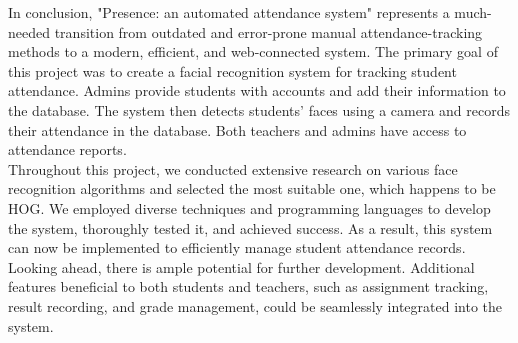In conclusion, "Presence: an automated attendance system" represents a much-needed transition from outdated and error-prone manual attendance-tracking methods to a modern, efficient, and web-connected system. The primary goal of this project was to create a facial recognition system for tracking student attendance. Admins provide students with accounts and add their information to the database. The system then detects students' faces using a camera and records their attendance in the database. Both teachers and admins have access to attendance reports.\\

Throughout this project, we conducted extensive research on various face recognition algorithms and selected the most suitable one, which happens to be HOG. We employed diverse techniques and programming languages to develop the system, thoroughly tested it, and achieved success. As a result, this system can now be implemented to efficiently manage student attendance records.\\

Looking ahead, there is ample potential for further development. Additional features beneficial to both students and teachers, such as assignment tracking, result recording, and grade management, could be seamlessly integrated into the system.
